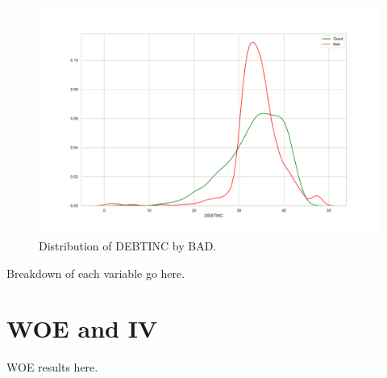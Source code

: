\begin{figure}[!ht]
	\centering
	\includegraphics[scale=0.40]{figs/debtinc_dist.pdf}
	\caption{Distribution of DEBTINC by BAD. \label{debtinc_dist}}
\end{figure}


Breakdown of each variable go here.

\section{WOE and IV}

WOE results here.

